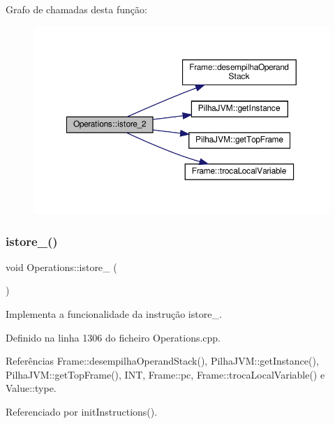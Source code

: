Grafo de chamadas desta função\+:\nopagebreak
\begin{figure}[H]
\begin{center}
\leavevmode
\includegraphics[width=350pt]{classOperations_a0fbc901b4c88aef8455b30d9b2063447_cgraph}
\end{center}
\end{figure}
\mbox{\label{classOperations_a3ff20f0475eaaa28501ea330074f5cb7}} 
\subsubsection{\texorpdfstring{istore\+\_()}{istore\_3()}}
{\footnotesize\ttfamily void Operations\+::istore\+\_ (\begin{DoxyParamCaption}{ }\end{DoxyParamCaption})\hspace{0.3cm}{\ttfamily [private]}}



Implementa a funcionalidade da instrução istore\+\_. 



Definido na linha 1306 do ficheiro Operations.\+cpp.



Referências Frame\+::desempilha\+Operand\+Stack(), Pilha\+J\+V\+M\+::get\+Instance(), Pilha\+J\+V\+M\+::get\+Top\+Frame(), I\+NT, Frame\+::pc, Frame\+::troca\+Local\+Variable() e Value\+::type.



Referenciado por init\+Instructions().

